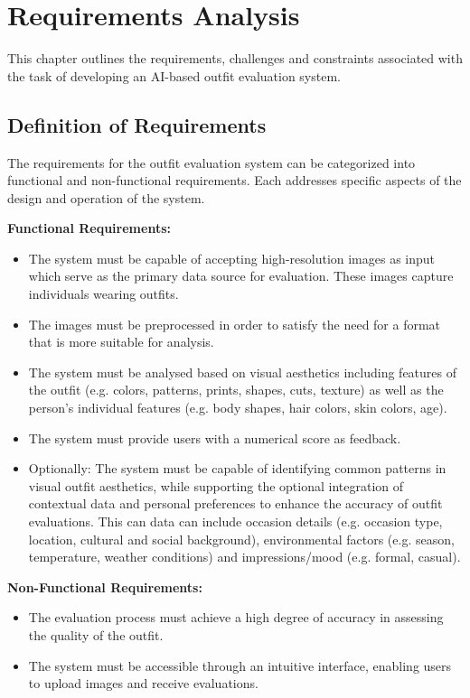 \chapter{Requirements Analysis}

This chapter outlines the requirements, challenges and constraints associated with the task of developing an \acs{AI}-based outfit evaluation system.

\section{Definition of Requirements}

The requirements for the outfit evaluation system can be categorized into functional and non-functional requirements. Each addresses specific aspects of the design and operation of the system.

\vspace{0.5cm}

\textbf{Functional Requirements:}

\begin{itemize}
  \item The system must be capable of accepting high-resolution images as input which serve as the primary data source for evaluation. These images capture individuals wearing outfits.
  \item The images must be preprocessed in order to satisfy the need for a format that is more suitable for analysis.
  \item The system must be analysed based on visual aesthetics including features of the outfit (e.g. colors, patterns, prints, shapes, cuts, texture) as well as the person's individual features (e.g. body shapes, hair colors, skin colors, age).
  \item The system must provide users with a numerical score as feedback.
  \item Optionally: The system must be capable of identifying common patterns in visual outfit aesthetics, while supporting the optional integration of contextual data and personal preferences to enhance the accuracy of outfit evaluations. This can data can include occasion details (e.g. occasion type, location, cultural and social background), environmental factors (e.g. season, temperature, weather conditions) and impressions/mood (e.g. formal, casual).
\end{itemize}

\textbf{Non-Functional Requirements:}

\begin{itemize}
  \item The evaluation process must achieve a high degree of accuracy in assessing the quality of the outfit.
  \item The system must be accessible through an intuitive interface, enabling users to upload images and receive evaluations.
\end{itemize}

